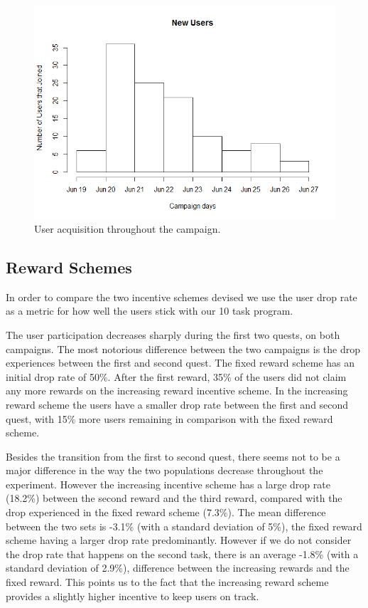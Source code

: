 \documentclass[letterpaper]{article}
\begin{document}
\begin{figure}[htb]
	\begin{center}
		\includegraphics[width=1\linewidth]{images/NewUsers}
		\caption{User acquisition throughout the campaign.\label{fig:newusers1}}
	\end{center}
\end{figure}



\subsection{Reward Schemes}

In order to compare the two incentive schemes devised we use the user drop rate as a metric for how well the users stick with our 10 task program.

The user participation decreases sharply during the first two quests, on both campaigns.
The most notorious difference between the two campaigns is the drop experiences between the first and second quest. 
The fixed reward scheme has an initial drop rate of 50\%. After the first reward, 35\% of the users did not claim any more rewards on the increasing reward incentive scheme.  
In the increasing reward scheme the users have a smaller drop rate between the first and second quest, with 15\% more users remaining in comparison with the fixed reward scheme.

Besides the transition from the first to second quest, there seems not to be a major difference in the way the two populations decrease throughout the experiment. 
However the increasing incentive scheme has a large drop rate (18.2\%) between the second reward and the third reward, compared with the drop experienced in the fixed reward scheme (7.3\%). 
The mean difference between the two sets is -3.1\% (with a standard deviation of 5\%), the fixed reward scheme having a larger drop rate predominantly. However if we do not consider the drop rate that happens on the second task, there is an average -1.8\% (with a standard deviation of 2.9\%), difference between the increasing rewards and the fixed reward. This points us to the fact that the increasing reward scheme provides a slightly higher incentive to keep users on track.
\end{document}
